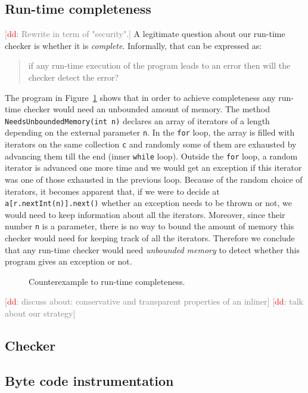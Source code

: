 \documentclass{llncs} %
\newcommand{\noterg}[2]{\textcolor{gray}{[\textcolor{red}{#1}: #2]}}
\newcommand{\dd}[1]{\noterg{dd}{#1}}
\newcommand{\dinocomment}[1]{\dd{#1}}
\begin{document}
\subsection{Run-time completeness}
\dinocomment{Rewrite in term of "security".}
A legitimate question about our run-time checker is whether it is {\em complete}. Informally, that can be expressed as:
\begin{quote}
if any run-time execution of the program leads to an error then will the checker detect the error?
\end{quote}
The program in Figure~\ref{fig:completeness} shows that in order to
achieve completeness any run-time checker would need an unbounded
amount of memory. The method {\tt NeedsUnboundedMemory(int n)}
declares an array of iterators of a length depending on the external parameter {\tt n}.  In the {\tt for} loop, the array is filled with iterators on the same collection {\tt c} and randomly some of them are exhausted by advancing them till the end (inner {\tt while} loop).
Outside the {\tt for} loop, a random iterator is advanced one more time and we would get an exception if this iterator 
was one of those exhausted in the previous loop. Because of the random choice of iterators, it becomes apparent that, 
if we were to decide at {\tt a[r.nextInt(n)].next()} whether an exception needs to be thrown or not, we would need to keep information about all the iterators. Moreover, since their number {\tt n} is a parameter, there is no way to bound the amount of memory this checker would need for keeping track of all the iterators. Therefore we conclude that any run-time checker would need {\em unbounded memory} to detect whether this program gives an exception or not. 
%
\begin{figure}[htbp]
\begin{center}

\caption{Counterexample to run-time completeness.}
\label{fig:completeness}
\end{center}
\end{figure}

\dinocomment{discuss about: conservative and transparent properties of an inliner}
\dinocomment{talk about our strategy}
\subsection{Checker}
\subsection{Byte code instrumentation}
\end{document}
